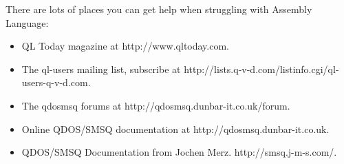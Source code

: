 There are lots of places you can get help when struggling with
    Assembly Language:
\begin{itemize}[itemsep=0pt]

\item{}QL Today magazine at http://www.qltoday.com.


\item{}The ql-{}users mailing list, subscribe at
        http://lists.q-{}v-{}d.com/listinfo.cgi/ql-{}users-{}q-{}v-{}d.com.


\item{}The qdosmsq forums at
        http://qdosmsq.dunbar-{}it.co.uk/forum.


\item{}Online QDOS/SMSQ documentation at
        http://qdosmsq.dunbar-{}it.co.uk.


\item{}QDOS/SMSQ Documentation from Jochen Merz.
        http://smsq.j-{}m-{}s.com/.

\end{itemize}
